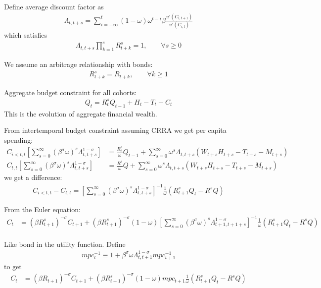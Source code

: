 \documentclass[11pt]{article}
\begin{document}
Define average discount factor as
\begin{align*}
	\Lambda_{t,t+s} = \sum_{i=-\infty}^{t}(1-\omega)\omega^{t-i} \beta \frac{u'(C_{i,t+1})}{u'(C_{i,t})}
\end{align*}
which satisfies
\begin{align*}
	\Lambda_{t,t+s}\prod_{k=1}^{s}R_{t+k}^s  = 1,\qquad \forall s\ge 0
\end{align*}

We assume an arbitrage relationship with bonds:
\begin{align*}
    R_{t+k}^s = R_{t+k},\qquad \forall k\ge 1
\end{align*}

Aggregate budget constraint for all cohorts:
\begin{align*}
    Q_t = R_t^s Q_{t-1} + H_t - T_t - C_t
\end{align*}
This is the evolution of aggregate financial wealth.

From intertemporal budget constraint assuming CRRA we get per capita spending:
\begin{align*}
	C_{i<t,t}\left[\sum_{s=0}^{\infty}(\beta^{\sigma}\omega)^s \Lambda_{t,t+s}^{1-\sigma}\right]  &= \frac{R_{t}^s}{\omega} Q_{t-1} + \sum_{s=0}^{\infty}\omega^s \Lambda_{t,t+s}(W_{t+s}H_{t+s} - T_{t+s}-M_{t+s}) \\
    C_{t,t}\left[\sum_{s=0}^{\infty}(\beta^{\sigma}\omega)^s \Lambda_{t,t+s}^{1-\sigma}\right]  &= \frac{R^s}{\omega} Q + \sum_{s=0}^{\infty}\omega^s \Lambda_{t,t+s}(W_{t+s}H_{t+s} - T_{t+s}-M_{t+s})
\end{align*}
we get a difference:
\begin{align*}
    C_{i<t,t} - C_{t,t} = \left[\sum_{s=0}^{\infty}(\beta^{\sigma}\omega)^s \Lambda_{t,t+s}^{1-\sigma}\right]^{-1}\frac{1}{\omega}(R_{t+1}^s Q_{t}- R^s Q) 
\end{align*}

From the Euler equation:
\begin{align*}
    C_{t}&=(\beta R_{t+1}^s)^{-\sigma}C_{t+1} +(\beta R_{t+1}^s)^{-\sigma} (1-\omega)\left[\sum_{s=0}^{\infty}(\beta^{\sigma}\omega)^s \Lambda_{t+1,t+1+s}^{1-\sigma}\right]^{-1}\frac{1}{\omega}(R_{t+1}^s Q_{t}- R^s Q) \\
\end{align*}

Like bond in the utility function. Define 
\begin{align*}
    mpc_t^{-1} \equiv 1 + \beta^{\sigma}\omega \Lambda_{t,t+1}^{1-\sigma}mpc_{t+1}^{-1} 
\end{align*}
to get
\begin{align*}
    C_{t}&=(\beta R_{t+1})^{-\sigma}C_{t+1} +(\beta R_{t+1}^s)^{-\sigma} (1-\omega)mpc_{t+1} \frac{1}{\omega}(R_{t+1}^s Q_{t}- R^s Q) \\
\end{align*}
\end{document}
